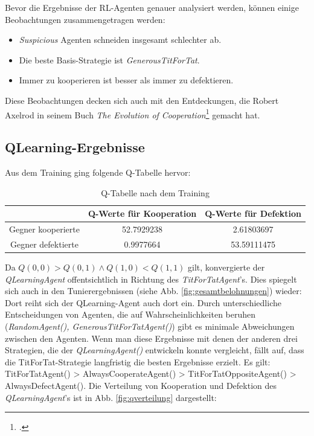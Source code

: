 Bevor die Ergebnisse der RL-Agenten genauer analysiert werden, können einige Beobachtungen zusammengetragen werden:
\begin{itemize}
    \item \textit{Suspicious} Agenten schneiden insgesamt schlechter ab.
    \item Die beste Basis-Strategie ist \textit{GenerousTitForTat}.
    \item Immer zu kooperieren ist besser als immer zu defektieren.
\end{itemize}
Diese Beobachtungen decken sich auch mit den Entdeckungen, die Robert Axelrod in seinem Buch 
\textit{The Evolution of Cooperation}\footcite{axelrod1984cooperation} gemacht hat.

\subsection{QLearning-Ergebnisse}
Aus dem Training ging folgende Q-Tabelle hervor:
\begin{table}[H]
    \centering
    \begin{tabular}{c|c|c}
            & Q-Werte für Kooperation & Q-Werte für Defektion \\
        \hline
        Gegner kooperierte &  52.7929238 & 2.61803697\\
        \hline
        Gegner defektierte &  0.9977664 & 53.59111475 \\
    \end{tabular}
    \caption{Q-Tabelle nach dem Training}
    \label{table:qtableaftertraining}
\end{table}
Da $Q(0, 0) > Q(0, 1) \land Q(1, 0) < Q(1, 1)$ gilt, konvergierte der \textit{QLearningAgent} offentsichtlich in Richtung des
\textit{TitForTatAgent}'s. Dies spiegelt sich auch in den Tunierergebnissen (siehe Abb. \ref{fig:gesamtbelohnungen}) wieder:
Dort reiht sich der QLearning-Agent auch dort ein. Durch unterschiedliche Entscheidungen von Agenten, die auf Wahrscheinlichkeiten 
beruhen (\textit{RandomAgent(), \textit{GenerousTitForTatAgent()}}) gibt es minimale Abweichungen zwischen den Agenten.
Wenn man diese Ergebnisse mit denen der anderen drei Strategien, die der \textit{QLearningAgent()} entwickeln konnte vergleicht,
fällt auf, dass die TitForTat-Strategie langfristig die besten Ergebnisse erzielt. Es gilt:
TitForTatAgent() > AlwaysCooperateAgent() > TitForTatOppositeAgent() > AlwaysDefectAgent().
Die Verteilung von Kooperation und Defektion des \textit{QLearningAgent}'s ist in Abb. \ref{fig:qverteilung} dargestellt:
